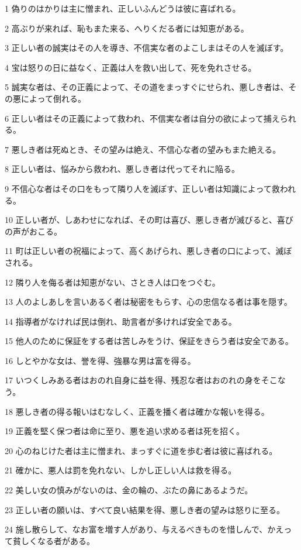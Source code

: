 \par 1 偽りのはかりは主に憎まれ、正しいふんどうは彼に喜ばれる。
\par 2 高ぶりが来れば、恥もまた来る、へりくだる者には知恵がある。
\par 3 正しい者の誠実はその人を導き、不信実な者のよこしまはその人を滅ぼす。
\par 4 宝は怒りの日に益なく、正義は人を救い出して、死を免れさせる。
\par 5 誠実な者は、その正義によって、その道をまっすぐにせられ、悪しき者は、その悪によって倒れる。
\par 6 正しい者はその正義によって救われ、不信実な者は自分の欲によって捕えられる。
\par 7 悪しき者は死ぬとき、その望みは絶え、不信心な者の望みもまた絶える。
\par 8 正しい者は、悩みから救われ、悪しき者は代ってそれに陥る。
\par 9 不信心な者はその口をもって隣り人を滅ぼす、正しい者は知識によって救われる。
\par 10 正しい者が、しあわせになれば、その町は喜び、悪しき者が滅びると、喜びの声がおこる。
\par 11 町は正しい者の祝福によって、高くあげられ、悪しき者の口によって、滅ぼされる。
\par 12 隣り人を侮る者は知恵がない、さとき人は口をつぐむ。
\par 13 人のよしあしを言いあるく者は秘密をもらす、心の忠信なる者は事を隠す。
\par 14 指導者がなければ民は倒れ、助言者が多ければ安全である。
\par 15 他人のために保証をする者は苦しみをうけ、保証をきらう者は安全である。
\par 16 しとやかな女は、誉を得、強暴な男は富を得る。
\par 17 いつくしみある者はおのれ自身に益を得、残忍な者はおのれの身をそこなう。
\par 18 悪しき者の得る報いはむなしく、正義を播く者は確かな報いを得る。
\par 19 正義を堅く保つ者は命に至り、悪を追い求める者は死を招く。
\par 20 心のねじけた者は主に憎まれ、まっすぐに道を歩む者は彼に喜ばれる。
\par 21 確かに、悪人は罰を免れない、しかし正しい人は救を得る。
\par 22 美しい女の慎みがないのは、金の輪の、ぶたの鼻にあるようだ。
\par 23 正しい者の願いは、すべて良い結果を得、悪しき者の望みは怒りに至る。
\par 24 施し散らして、なお富を増す人があり、与えるべきものを惜しんで、かえって貧しくなる者がある。
